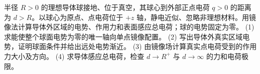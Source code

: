半径 \(R>0\) 的理想导体球接地、位于真空，其球心到外部正点电荷 \(q>0\) 的距离为 \(d>R\)。以球心为原点、点电荷位于 \(+z\) 轴，静电近似、忽略非理想材料。用镜像法计算导体外区域的电势、作用力和表面感应总电荷；球的电势固定为零。
(1) 求能使整个球面电势为零的唯一轴向单点镜像配置。
(2) 写出导体外真实区域电势，证明球面条件并给出远处电势渐近。
(3) 由镜像场计算真实点电荷受到的作用力大小及方向。
(4) 求导体感应总电荷，检查 \(d\to R^+\) 与 \(d\to\infty\) 的力和电荷极限。
